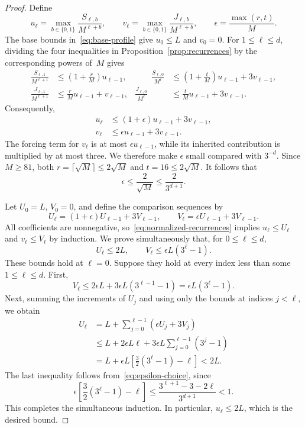 \documentclass[11pt]{article}
\theoremstyle{definition}
\theoremstyle{remark}
\begin{document}
\begin{proof}
Define
\[
 u_\ell=\max_{b\in\{0,1\}}\frac{S_{\ell,b}}{M^{\ell+b}},
 \qquad
 v_\ell=\max_{b\in\{0,1\}}\frac{J_{\ell,b}}{M^{\ell+b}},
 \qquad
 \epsilon=\frac{\max(r,t)}{M}.
\]
The base bounds in~\eqref{eq:base-profile} give $u_0\leq L$ and $v_0=0$.
For $1\leq\ell\leq d$, dividing the four inequalities in
Proposition~\ref{prop:recurrences} by the corresponding powers of~$M$
gives
\begin{align*}
 \frac{S_{\ell,1}}{M^{\ell+1}}
   &\leq \left(1+\frac rM\right)u_{\ell-1},
 &\qquad
 \frac{S_{\ell,0}}{M^\ell}
   &\leq \left(1+\frac tM\right)u_{\ell-1}+3v_{\ell-1},\\
 \frac{J_{\ell,1}}{M^{\ell+1}}
   &\leq \frac rM u_{\ell-1}+v_{\ell-1},
 &
 \frac{J_{\ell,0}}{M^\ell}
   &\leq \frac tM u_{\ell-1}+3v_{\ell-1}.
\end{align*}
Consequently,
\begin{equation}
\label{eq:normalized-recurrences}
 \begin{split}
  u_\ell&\leq (1+\epsilon)u_{\ell-1}+3v_{\ell-1},\\
  v_\ell&\leq \epsilon u_{\ell-1}+3v_{\ell-1}.
 \end{split}
\end{equation}
The forcing term for $v_\ell$ is at most $\epsilon u_{\ell-1}$, while
its inherited contribution is multiplied by at most three. We therefore
make $\epsilon$ small compared with $3^{-d}$. Since $M\geq81$, both
$r=\lceil\sqrt M\rceil\leq2\sqrt M$ and $t=16\leq2\sqrt M$.
It follows that
\begin{equation}
\label{eq:epsilon-choice}
 \epsilon\leq\frac{2}{\sqrt M}\leq\frac{2}{3^{d+1}}.
\end{equation}

Let $U_0=L$, $V_0=0$, and define the comparison sequences by
\[
 U_\ell=(1+\epsilon)U_{\ell-1}+3V_{\ell-1},
 \qquad
 V_\ell=\epsilon U_{\ell-1}+3V_{\ell-1}.
\]
All coefficients are nonnegative, so~\eqref{eq:normalized-recurrences}
implies $u_\ell\leq U_\ell$ and $v_\ell\leq V_\ell$ by induction.
We prove simultaneously that, for $0\leq\ell\leq d$,
\begin{equation}
\label{eq:comparison-bounds}
 U_\ell\leq2L,
 \qquad
 V_\ell\leq\epsilon L(3^\ell-1).
\end{equation}
These bounds hold at $\ell=0$.
Suppose they hold at every index less than some $1\leq\ell\leq d$.
First,
\[
 V_\ell
 \leq 2\epsilon L+3\epsilon L(3^{\ell-1}-1)
 =\epsilon L(3^\ell-1).
\]
Next, summing the increments of $U_j$ and using only the bounds at
indices $j<\ell$, we obtain
\begin{align*}
 U_\ell
 &=L+\sum_{j=0}^{\ell-1}(\epsilon U_j+3V_j)\\
 &\leq L+2\epsilon L\ell
          +3\epsilon L\sum_{j=0}^{\ell-1}(3^j-1)\\
 &=L+\epsilon L\left[\frac32(3^\ell-1)-\ell\right]
 <2L.
\end{align*}
The last inequality follows from~\eqref{eq:epsilon-choice}, since
\[
 \epsilon\left[\frac32(3^\ell-1)-\ell\right]
 \leq\frac{3^{\ell+1}-3-2\ell}{3^{d+1}}<1.
\]
This completes the simultaneous induction. In particular,
$u_\ell\leq2L$, which is the desired bound.
\end{proof}
\end{document}

